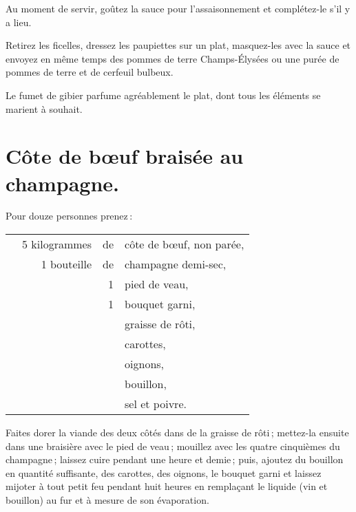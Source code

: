Au moment de servir, goûtez la sauce pour l'assaisonnement et complétez-le s'il
y a lieu.

Retirez les ficelles, dressez les paupiettes sur un plat, masquez-les avec la
sauce et envoyez en même temps des pommes de terre Champs-Élysées ou une purée
de pommes de terre et de cerfeuil bulbeux.

Le fumet de gibier parfume agréablement le plat, dont tous les éléments se
marient à souhait.

\section*{\centering Côte de bœuf braisée au champagne.}
{}

Pour douze personnes prenez :

\medskip

\footnotesize
\begin{longtable}{rrrrp{16em}}
  & \multicolumn{2}{r}{5 kilogrammes} & de & côte de bœuf, non parée,                                     \\
  & \multicolumn{2}{r}{1 bouteille}   & de & champagne demi-sec,                                          \\
  &     &             &  1 & pied de veau,                                                                \\
  &     &             &  1 & bouquet garni,                                                               \\
  &     &             &    & graisse de rôti,                                                             \\
  &     &             &    & carottes,                                                                    \\
  &     &             &    & oignons,                                                                     \\
  &     &             &    & bouillon,                                                                    \\
  &     &             &    & sel et poivre.                                                               \\
\end{longtable}
\normalsize

Faites dorer la viande des deux côtés dans de la graisse de rôti ; mettez-la
ensuite dans une braisière avec le pied de veau ; mouillez avec les quatre
cinquièmes du champagne ; laissez cuire pendant une heure et demie ; puis,
ajoutez du bouillon en quantité suffisante, des carottes, des oignons, le
bouquet garni et laissez mijoter à tout petit feu pendant huit heures en
remplaçant le liquide (vin et bouillon) au fur et à mesure de son évaporation.

